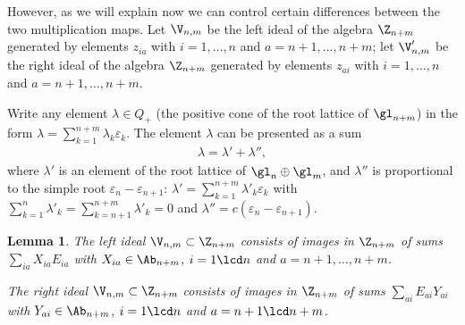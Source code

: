 \documentclass[11pt]{article}
\newtheorem{lem}[theorem]{Lemma}
\def\nplus{\mathfrak{n}}\def\nn{\nonumber}\def\nin{\noindent}
\def\s{z}\def\S{\mathrm {S}}\def\si{\sigma}\def\Sp{\S^{\nplus}}\def\sy{\acute{\sigma}}\def\th{\mathring{h}}
\numberwithin{equation}{section}
\begin{document}
However, as we will explain now we can control certain dif\/ferences between the two multiplication maps. Let $\V_{n,m}$ be the left ideal of the
algebra $\Z_{n+m}$ generated by elements $\s_{ia}$ with $i=1,\ldots,n$ and $a=n+1,\ldots, n+m$; let  $\V_{n,m}'$ be the right ideal of the
algebra $\Z_{n+m}$ generated by elements $\s_{ai}$ with $i=1,\ldots, n$ and $a=n+1,\ldots, n+m$.


Write any element $\lambda\in Q_+$ (the positive cone of the root lattice of $\gl_{n+m}$) in the form $\lambda=\sum_{k=1}^{n+m}\lambda_k\varepsilon_k$.
The element $\lambda$ can be presented as a sum
\begin{gather}\label{lalaplapp}\lambda= \lambda'+\lambda''  ,\end{gather}
where $\lambda'$ is an element of the root lattice of $\gl_n\oplus \gl_m$, and $\lambda''$ is
proportional to the simple root $\varepsilon_n-\varepsilon_{n+1}$: $\lambda'=\sum_{k=1}^{n+m}\lambda'_k\varepsilon_k$ with
$\sum_{k=1}^n\lambda'_k =  \sum_{k=n+1}^{n+m}\lambda'_k=0$ and $\lambda''=c(\varepsilon_n-\varepsilon_{n+1})$.

\begin{lem}\label{lemma1}%
The left ideal  $\V_{n,m}\subset\Z_{n+m}$ consists of images in $\Z_{n+m}$ of  sums
$\sum_{ia}X_{ia} E_{ia}$ with $X_{ia}\in\Ab_{n+m}$, $i=1\lcd n$ and $a=n+1,\dots, n+m$.


The right ideal   $\V_{n,m}\subset\Z_{n+m}$ consists of images in $\Z_{n+m}$ of  sums $\sum_{ai} E_{ai}Y_{ai}$ with $Y_{ai}\in\Ab_{n+m}$,
$i=1\lcd n $ and  $a=n+1
\lcd n+m$.\end{lem}
\end{document}
